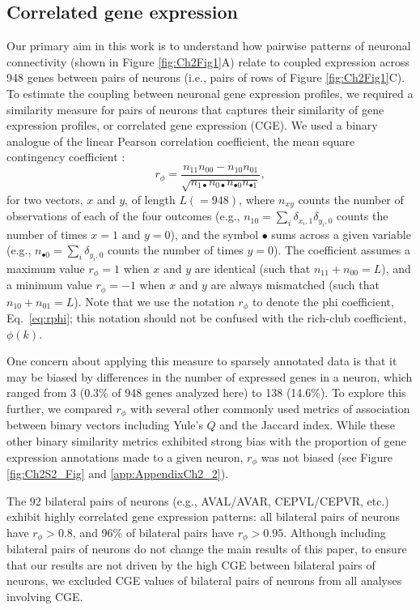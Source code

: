 \subsection*{Correlated gene expression}
Our primary aim in this work is to understand how pairwise patterns of neuronal connectivity (shown in Figure \ref{fig:Ch2Fig1}A) relate to coupled expression across 948 genes between pairs of neurons (i.e., pairs of rows of Figure \ref{fig:Ch2Fig1}C).
To estimate the coupling between neuronal gene expression profiles, we required a similarity measure for pairs of neurons that captures their similarity of gene expression profiles, or correlated gene expression (CGE).
We used a binary analogue of the linear Pearson correlation coefficient, the mean square contingency coefficient \citep{Warrens2008}:
\begin{equation} \label{eq:rphi}
    r_\phi = \frac{n_{11}n_{00} - n_{10}n_{01}}{\sqrt{n_{1\bullet}n_{0\bullet}n_{\bullet 0}n_{\bullet 1}}},
\end{equation}
for two vectors, $x$ and $y$, of length $L (=948)$, where $n_{xy}$ counts the number of observations of each of the four outcomes (e.g., $n_{10} = \sum_i \delta_{x_i,1}\delta_{y_i,0}$ counts the number of times $x=1$ and $y=0$), and the symbol $\bullet$ sums across a given variable (e.g., $n_{\bullet 0} = \sum_i \delta_{y_i,0}$ counts the number of times $y = 0$).
The coefficient assumes a maximum value $r_\phi = 1$ when $x$ and $y$ are identical (such that $n_{11} + n_{00} = L$), and a minimum value $r_\phi = -1$ when $x$ and $y$ are always mismatched (such that $n_{10} + n_{01} = L$).
Note that we use the notation $r_\phi$ to denote the phi coefficient, Eq.~\eqref{eq:rphi}; this notation should not be confused with the rich-club coefficient, $\phi(k)$.

One concern about applying this measure to sparsely annotated data is that it may be biased by differences in the number of expressed genes in a neuron, which ranged from 3 (0.3\% of 948 genes analyzed here) to 138 (14.6\%).
To explore this further, we compared $r_\phi$ with several other commonly used metrics of association between binary vectors including Yule's $Q$ and the Jaccard index.
While these other binary similarity metrics exhibited strong bias with the proportion of gene expression annotations made to a given neuron, $r_\phi$ was not biased (see Figure \ref{fig:Ch2S2_Fig} and \ref{app:AppendixCh2_2}).

The 92 bilateral pairs of neurons (e.g., AVAL/AVAR, CEPVL/CEPVR, etc.) exhibit highly correlated gene expression patterns: all bilateral pairs of neurons have $r_\phi > 0.8$, and 96\% of bilateral pairs have $r_\phi > 0.95$.
Although including bilateral pairs of neurons do not change the main results of this paper, to ensure that our results are not driven by the high CGE between bilateral pairs of neurons, we excluded CGE values of bilateral pairs of neurons from all analyses involving CGE.

